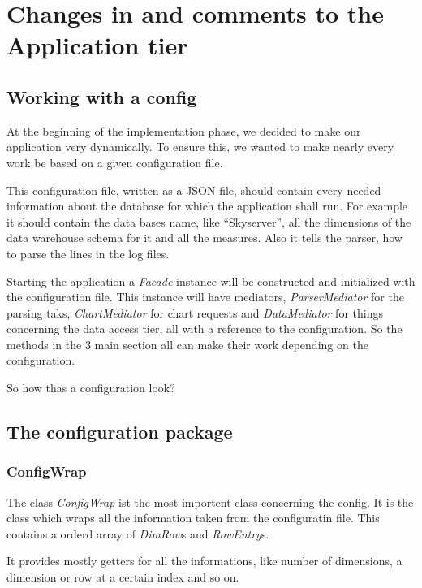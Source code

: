 \section{Changes in and comments to the Application tier}





\subsection{Working with a config}
At the beginning of the implementation phase, we decided to make our
application very dynamically. To ensure this, we wanted to make nearly
every work be based on a given configuration file.

This configuration file, written as a JSON file, should contain
every needed information about the database for which the application shall run.
For example it should contain the data bases name, like ``Skyserver'',  all the
dimensions of the data warehouse schema for it and all the measures. Also it
tells the parser, how to parse the lines in the log files.


Starting the application a \textit{Facade} instance will be constructed and initialized
with the configuration file. This instance will have mediators, 
\textit{ParserMediator} for the parsing taks, \textit{ChartMediator} for chart requests
and \textit{DataMediator} for things concerning the data access tier, all with a reference
to the configuration. So the methods in the 3 main section all can make their work depending
on the configuration. 

So how thas a configuration look? 

\subsection{The configuration package}

\subsubsection{ConfigWrap} 
The class \textit{ConfigWrap} ist the most importent class concerning the config.
It is the class which wraps all the information taken from the configuratin file.
This contains a orderd array of \textit{DimRow}s and \textit{RowEntry}s.
 
It provides mostly getters for all the informations, like number of dimensions,
a dimension or row at a certain index and so on.

